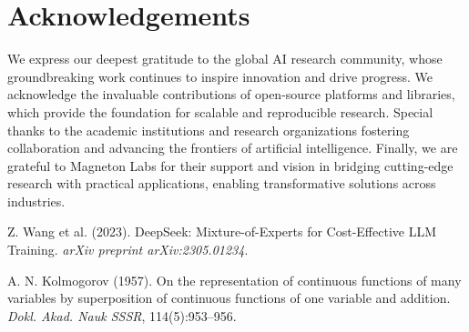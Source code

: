 \documentclass[twocolumn]{article}
\begin{document}
\section*{Acknowledgements}
We express our deepest gratitude to the global AI research community, whose groundbreaking work continues to inspire innovation and drive progress. We acknowledge the invaluable contributions of open-source platforms and libraries, which provide the foundation for scalable and reproducible research. Special thanks to the academic institutions and research organizations fostering collaboration and advancing the frontiers of artificial intelligence. Finally, we are grateful to Magneton Labs for their support and vision in bridging cutting-edge research with practical applications, enabling transformative solutions across industries.


\begin{thebibliography}{9}

Z. Wang et al. (2023).
\newblock DeepSeek: Mixture-of-Experts for Cost-Effective LLM Training.
\newblock \emph{arXiv preprint arXiv:2305.01234}.

A. N. Kolmogorov (1957).
\newblock On the representation of continuous functions of many variables by superposition of continuous functions of one variable and addition.
\newblock \emph{Dokl. Akad. Nauk SSSR}, 114(5):953–956.

\end{thebibliography}
\end{document}
